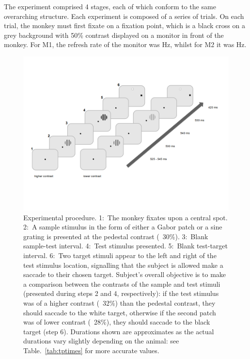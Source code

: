 The experiment comprised 4 stages, each of which conform to the same overarching structure.
Each experiment is composed of a series of trials. On each trial, the monkey must first fixate on a fixation point, which is a black cross on a grey background with 50\% contrast displayed on a monitor in front of the monkey. For \ac{M1}, the refresh rate of the monitor was \unit[85]{Hz}, whilst for \ac{M2} it was \unit[75]{Hz}.

\begin{figure}[htbp]
\begin{center}
\includegraphics[width=\linewidth]{./figs/info/PLtask1.png}
\end{center}
\caption{
Experimental procedure.
1:~The monkey fixates upon a central spot. 2:~A sample stimulus in the form of either a Gabor patch or a sine grating is presented at the pedestal contrast (\eg{}~30\%). 3:~Blank sample-test interval. 4:~Test stimulus presented. 5:~Blank test-target interval. 6:~Two target stimuli appear to the left and right of the test stimulus location, signalling that the subject is allowed make a saccade to their chosen target.
Subject's overall objective is to make a comparison between the contrasts of the sample and test stimuli (presented during steps 2 and 4, respectively): if the test stimulus was of a higher contrast (\eg{}~32\%) than the pedestal contrast, they should saccade to the white target, otherwise if the second patch was of lower contrast (\eg{}~28\%), they should saccade to the black target (step 6).
Durations shown are approximates as the actual durations vary slightly depending on the animal: see Table.~\ref{tab:tptimes} for more accurate values.}
\label{fig:pltask1}
\end{figure}

